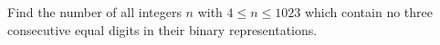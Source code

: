 Find the number of all integers $n$ with $4\le n\le 1023$ which contain no three consecutive equal digits in their binary representations.